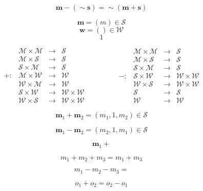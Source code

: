\documentclass[11pt, reqno]{book}%
\newcommand{\es}{\begin{equation}}
\newcommand{\ef}{\end{equation} \vspace{0.05in}}
\newcommand{\mbf}{\mathbf}
\begin{document}
\es
\mbf{m} - (\sim \mbf{s}) = \sim(\mbf{m}+\mbf{s})
\ef



\es
\mbf{m} = (m) \in\mathcal{S}
\ef
\es
\mbf{w} = () \in \mathcal{W}
\ef
\es
1
\ef

\es
\begin{array}{cccl}
& \mathcal{M}\times \mathcal{M} & \to & \mathcal{S} \\
&\mathcal{M}\times\mathcal{S} & \to & \mathcal{S} \\
&\mathcal{S}\times\mathcal{M} & \to & \mathcal{S} \\
+: & \mathcal{M} \times \mathcal{W} & \to & \mathcal{W} \\
& \mathcal{W}\times\mathcal{M} & \to & \mathcal{W} \\
& \mathcal{S}\times\mathcal{W} & \to & \mathcal{W}\times \mathcal{W} \\
& \mathcal{W}\times \mathcal{S} & \to & \mathcal{W}\times \mathcal{W}
\end{array} \quad\quad\quad\quad
\begin{array}{cccl}
& \mathcal{M}\times \mathcal{M} & \to & \mathcal{S} \\
&\mathcal{M}\times\mathcal{S} & \to & \mathcal{S} \\
&\mathcal{S}\times\mathcal{M} & \to & \mathcal{S} \\
-: & \mathcal{S}\times\mathcal{W} & \to & \mathcal{W}\times \mathcal{W} \\
& \mathcal{W}\times \mathcal{S} & \to & \mathcal{W}\times \mathcal{W} \\
& \mathcal{S}  & \to & \mathcal{S} \\
& \mathcal{W} & \to & \mathcal{W}
\end{array}
\ef

\es
\mbf{m}_1 + \mbf{m}_2 = (m_1, 1, m_2) \in \mathcal{S}
\ef

\es
\mbf{m}_1 - \mbf{m}_2 = (m_2, 1, m_1) \in \mathcal{S}
\ef

\es
\mbf{m}_1 + 
\ef

\es
m_1 + m_2 + m_3 = m_1 + m_3
\ef

\es
m_1 - m_2 - m_3 = 
\ef

\es
o_1 + o_2 = o_2 - o_1
\ef
\end{document}
